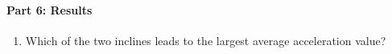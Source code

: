 \paragraph{Part 6: Results}
%
\begin{enumerate}
    \item Which of the two inclines leads to the largest average acceleration value?
\end{enumerate}
%
